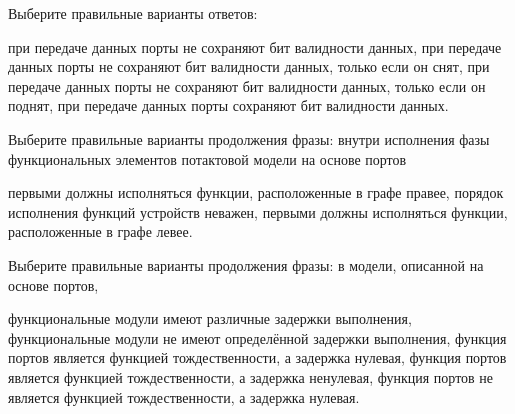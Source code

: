\begin{questions}

\question[3] Выберите правильные варианты ответов:
\begin{choices}
    \choice при передаче данных порты не сохраняют бит валидности данных,
    \choice при передаче данных порты не сохраняют бит валидности данных, только если он снят,
    \choice при передаче данных порты не сохраняют бит валидности данных, только если он поднят,
    \correctchoice при передаче данных порты сохраняют бит валидности данных.
\end{choices}

\question[3] Выберите правильные варианты продолжения фразы: внутри исполнения фазы функциональных элементов потактовой модели на основе портов 
\begin{choices}
    \choice первыми должны исполняться функции, расположенные в графе правее,
    \correctchoice порядок исполнения функций устройств неважен,
    \choice первыми должны исполняться функции, расположенные в графе левее.
\end{choices}

\question[3] Выберите правильные варианты продолжения фразы: в модели, описанной на основе портов,
\begin{choices}
    \choice функциональные модули имеют различные задержки выполнения,
    \correctchoice функциональные модули не имеют определённой задержки выполнения,
    \choice функция портов является функцией тождественности, а задержка нулевая,
    \correctchoice функция портов является функцией тождественности, а задержка ненулевая,
    \choice функция портов не является функцией тождественности, а задержка нулевая.
\end{choices}


\end{questions}

